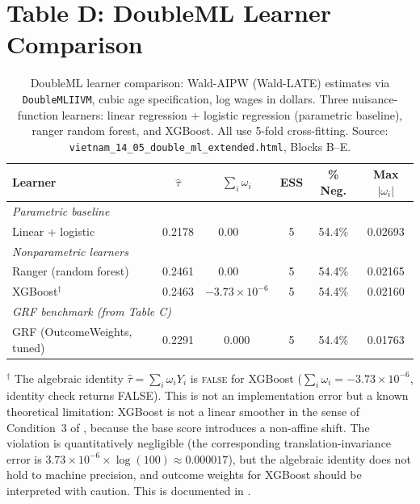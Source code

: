 \documentclass[12pt, a4paper]{article}
\begin{document}
\clearpage
\section*{Table D: DoubleML Learner Comparison}

\begin{table}[ht]
\centering
\caption{DoubleML learner comparison: Wald-AIPW (Wald-LATE) estimates via
  \texttt{DoubleMLIIVM}, cubic age specification, log wages in dollars.
  Three nuisance-function learners: linear regression + logistic regression
  (parametric baseline), ranger random forest, and XGBoost. All use 5-fold
  cross-fitting. Source: \texttt{vietnam\_14\_05\_double\_ml\_extended.html},
  Blocks B--E.}
\label{tab:doubleml_learners}
\vspace{6pt}
\begin{tabular}{lccccc}
\toprule
\textbf{Learner} & $\hat{\tau}$ & $\sum_i \omega_i$ & \textbf{ESS} &
  \textbf{\% Neg.} & \textbf{Max $|\omega_i|$} \\
\midrule
\multicolumn{6}{l}{\textit{Parametric baseline}} \\[3pt]
\rowcolor{dmlblue}
Linear + logistic & 0.2178 & $0.00\phantom{000}$ & 5 & 54.4\% & 0.02693 \\
\midrule
\multicolumn{6}{l}{\textit{Nonparametric learners}} \\[3pt]
\rowcolor{dmlblue}
Ranger (random forest) & 0.2461 & $0.00\phantom{000}$ & 5 & 54.4\% & 0.02165 \\
\rowcolor{dmlblue}
XGBoost$^{\dagger}$    & 0.2463 & $-3.73 \times 10^{-6}$ & 5 & 54.4\% & 0.02160 \\
\midrule
\multicolumn{6}{l}{\textit{GRF benchmark (from Table C)}} \\[3pt]
\rowcolor{dmlblue}
GRF (OutcomeWeights, tuned) & 0.2291 & $0.000$ & 5 & 54.4\% & 0.01763 \\
\bottomrule
\end{tabular}
\smallskip

\noindent\footnotesize
$^{\dagger}$ The algebraic identity $\hat{\tau} = \sum_i \omega_i Y_i$ is
\textsc{false} for XGBoost ($\sum_i \omega_i = -3.73 \times 10^{-6}$,
identity check returns FALSE). This is not an implementation error but a
known theoretical limitation: XGBoost is not a linear smoother in the
sense of Condition~3 of \citet[][Definition~3]{knaus2024outcome}, because
the base score introduces a non-affine shift. The violation is quantitatively
negligible (the corresponding translation-invariance error is
$3.73 \times 10^{-6} \times \log(100) \approx 0.000017$), but the algebraic
identity does not hold to machine precision, and outcome weights for XGBoost
should be interpreted with caution. This is documented in
\citet[][Table~6]{knaus2024outcome}.
\end{table}
\end{document}

